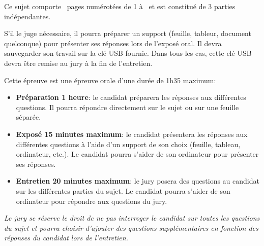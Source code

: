 \bigskip

\vspace{2cm}

Ce sujet comporte~\pageref{LastPage} pages numérotées de 1 à~\pageref{LastPage} et est constitué de 3 parties indépendantes.

\vspace{2cm}


S'il le juge nécessaire, il pourra préparer un support (feuille, tableur, document quelconque) pour présenter ses réponses lors de l'exposé oral. Il devra sauvegarder son travail sur la clé USB fournie. Dans tous les cas, cette clé USB devra être remise au jury à la fin de l'entretien.
\vspace{1cm}


Cette épreuve est une épreuve orale d'une durée de 1h35 maximum:
\begin{itemize}
    \item \textbf{Préparation 1 heure}: le candidat  préparera les réponses aux différentes questions. Il pourra répondre directement sur le sujet ou sur une feuille séparée.
    \item \textbf{Exposé 15 minutes maximum}: le candidat présentera les réponses aux différentes questions à l'aide d'un support de son choix (feuille, tableau, ordinateur, etc.). Le candidat pourra s'aider de son ordinateur pour présenter ses réponses.
    \item \textbf{Entretien 20 minutes maximum}: le jury posera des questions au candidat sur les différentes parties du sujet. Le candidat pourra s'aider de son ordinateur pour répondre aux questions du jury.
\end{itemize}


\vspace{2cm}

\emph{Le jury se réserve le droit de ne pas interroger le candidat sur toutes les questions du sujet et pourra choisir d'ajouter des questions supplémentaires en fonction des réponses du candidat lors de l'entretien.
}

\vfill

\newpage